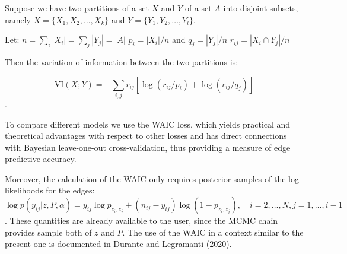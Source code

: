 \documentclass[11pt]{amsart}
\begin{document}
Suppose we have two partitions of a set $X$ and $Y$ of a set $A$ into disjoint subsets, namely  $X = \{X_{1}, X_{2}, \ldots, X_{k}\}$ and $Y = \{Y_{1}, Y_{2}, \ldots, Y_{l}\}$. 

Let:
$n = \sum_{i} |X_{i}| = \sum_{j} |Y_{j}|=|A|$
$p_{i} = |X_{i}| / n$ and $q_{j} = |Y_{j}| / n $
$r_{ij} = |X_i\cap Y_{j}| / n$

Then the variation of information between the two partitions is:

$$\mathrm{VI}(X; Y ) = - \sum_{i,j} r_{ij} \left[\log(r_{ij}/p_i)+\log(r_{ij}/q_j) \right]$$.

To compare different models we use the WAIC loss, which yields practical and theoretical advantages with respect to other losses and has direct connections with Bayesian leave-one-out cross-validation, thus providing a measure of edge predictive accuracy. 

Moreover, the calculation of the WAIC only requires posterior samples of the log-likelihoods for the edges:$
\log p(y_{ij} | z, P, \alpha) = y_{ij} \log p_{z_i, z_j} + (n_{ij}- y_{ij}) \log(1 - p_{z_i, z_j}), \quad i = 2, \ldots, N,  j = 1, \ldots, i - 1$. 
These quantities are already available to the user, since the MCMC chain provides sample both of $z$ and $P$.
The use of the WAIC in a context similar to the present one is documented in Durante and Legramanti (2020).
\end{document}
